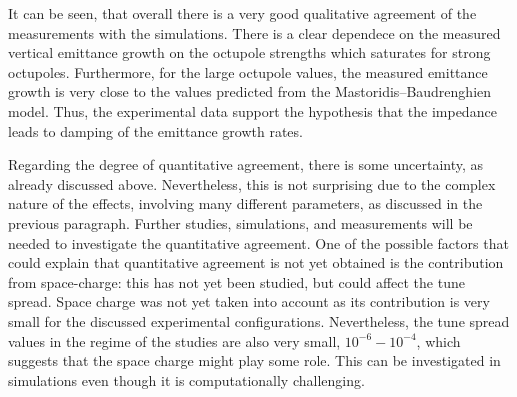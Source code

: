 It can be seen, that overall there is a very good qualitative agreement of the measurements with the simulations. There is a clear dependece on the measured vertical emittance growth on the octupole strengths which saturates for strong octupoles. Furthermore, for the large octupole values, the measured emittance growth is very close to the values predicted from the Mastoridis--Baudrenghien model. Thus, the experimental data support the hypothesis that the impedance leads to damping of the emittance growth rates. 

Regarding the degree of quantitative agreement, there is some uncertainty, as already discussed above. Nevertheless, this is not surprising due to the complex nature of the effects, involving many different parameters, as discussed in the previous paragraph. Further studies, simulations, and measurements will be needed to investigate the quantitative agreement. One of the possible factors that could explain that quantitative agreement is not yet obtained is the contribution from space-charge: this has not yet been studied, but could affect the tune spread. Space charge was not yet taken into account as its contribution is very small for the discussed experimental configurations. Nevertheless, the tune spread values in the regime of the studies are also very small, $10^{-6}-10^{-4}$, which suggests that the space charge might play some role. This can be investigated in simulations even though it is computationally challenging.









